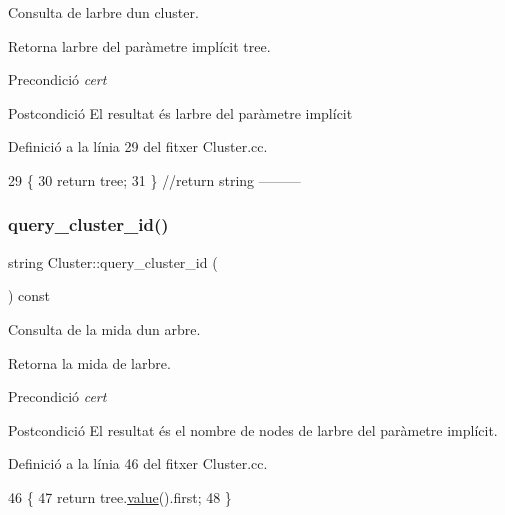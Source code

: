 Consulta de l\textquotesingle{}arbre d\textquotesingle{}un cluster. 

Retorna l\textquotesingle{}arbre del paràmetre implícit tree.

\begin{DoxyPrecond}{Precondició}
{\itshape cert} 
\end{DoxyPrecond}
\begin{DoxyPostcond}{Postcondició}
El resultat és l\textquotesingle{}arbre del paràmetre implícit 
\end{DoxyPostcond}


Definició a la línia 29 del fitxer Cluster.\+cc.


\begin{DoxyCode}
29                                                         \{
30     \textcolor{keywordflow}{return} tree;
31 \} \textcolor{comment}{//return string ---------}
\end{DoxyCode}
\mbox{\label{class_cluster_a7e077596f7eb4f2bdf2847d65fa37654}} 
\subsubsection{\texorpdfstring{query\+\_\+cluster\+\_\+id()}{query\_cluster\_id()}}
{\footnotesize\ttfamily string Cluster\+::query\+\_\+cluster\+\_\+id (\begin{DoxyParamCaption}{ }\end{DoxyParamCaption}) const}



Consulta de la mida d\textquotesingle{}un arbre. 

Retorna la mida de l\textquotesingle{}arbre.

\begin{DoxyPrecond}{Precondició}
{\itshape cert} 
\end{DoxyPrecond}
\begin{DoxyPostcond}{Postcondició}
El resultat és el nombre de nodes de l\textquotesingle{}arbre del paràmetre implícit. 
\end{DoxyPostcond}


Definició a la línia 46 del fitxer Cluster.\+cc.


\begin{DoxyCode}
46                                        \{
47     \textcolor{keywordflow}{return} tree.\hyperlink{class_bin_tree_a734e785b089c87b49187ee7c58edf5f3}{value}().first;
48 \}
\end{DoxyCode}
\mbox{\label{class_cluster_adc8ff607dd745107b5b6a454ac196e55}} 
